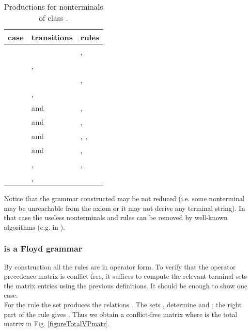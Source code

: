 \documentclass[3p,11pt]{elsarticle}
\begin{document}
\begin{table}[h!]
\caption{\label{productionsZ}Productions for  nonterminals of class . }
\renewcommand{\arraystretch}{1.3}
\begin{tabular}{l|p{}|p{7cm}}
  case & transitions  & rules \\
  \hline
  &  & ,  \\

  & ,  &  \\

       &  & , 
     \\

      & ,   &  \\

    &  and 
                   & , \\


      &    and 
                        & , \\

      &    and 
                        & ,  , \\

     &  and 
                      & ,  \\

       &  ,     &   ,   \\

       &    ,         &    \\
\hline
\end{tabular}
\end{table}
 Notice that the grammar  constructed may be not reduced (i.e. some nonterminal may be unreachable from the axiom or it may not derive any terminal string). In that case the useless nonterminals and rules can be removed by well-known algorithms (e.g. in \cite{hopullman:automata}).
\subsubsection*{ is a Floyd grammar}
By construction all the rules are in operator form. To verify that the operator precedence matrix  is conflict-free, it suffices to compute  the relevant terminal sets the matrix entries using  the previous definitions. It should be enough to show one case.
\\
 For the rule  the set
 produces the relations . The sets ,   determine  and ; the right part of the rule gives . Thus we obtain a conflict-free matrix  where  is the total matrix in Fig. \ref{figureTotalVPmatr}.
\end{document}
